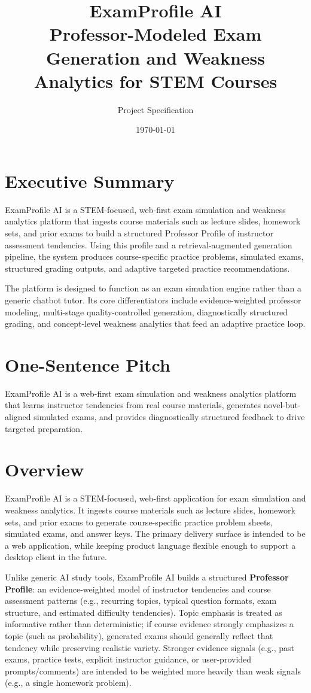 \documentclass[11pt]{article}
\title{ExamProfile AI \\ \large Professor-Modeled Exam Generation and Weakness Analytics for STEM Courses}
\author{Project Specification}
\date{\today}
\begin{document}
\maketitle
\tableofcontents
\newpage
\section{Executive Summary}
ExamProfile AI is a STEM-focused, web-first exam simulation and weakness analytics platform that ingests course materials such as lecture slides, homework sets, and prior exams to build a structured Professor Profile of instructor assessment tendencies. Using this profile and a retrieval-augmented generation pipeline, the system produces course-specific practice problems, simulated exams, structured grading outputs, and adaptive targeted practice recommendations.

The platform is designed to function as an exam simulation engine rather than a generic chatbot tutor. Its core differentiators include evidence-weighted professor modeling, multi-stage quality-controlled generation, diagnostically structured grading, and concept-level weakness analytics that feed an adaptive practice loop.

\section{One-Sentence Pitch}
ExamProfile AI is a web-first exam simulation and weakness analytics platform that learns instructor tendencies from real course materials, generates novel-but-aligned simulated exams, and provides diagnostically structured feedback to drive targeted preparation.

\section{Overview}
ExamProfile AI is a STEM-focused, web-first application for exam simulation and weakness analytics. It ingests course materials such as lecture slides, homework sets, and prior exams to generate course-specific practice problem sheets, simulated exams, and answer keys. The primary delivery surface is intended to be a web application, while keeping product language flexible enough to support a desktop client in the future.

Unlike generic AI study tools, ExamProfile AI builds a structured \textbf{Professor Profile}: an evidence-weighted model of instructor tendencies and course assessment patterns (e.g., recurring topics, typical question formats, exam structure, and estimated difficulty tendencies). Topic emphasis is treated as informative rather than deterministic; if course evidence strongly emphasizes a topic (such as probability), generated exams should generally reflect that tendency while preserving realistic variety. Stronger evidence signals (e.g., past exams, practice tests, explicit instructor guidance, or user-provided prompts/comments) are intended to be weighted more heavily than weak signals (e.g., a single homework problem).
\end{document}
